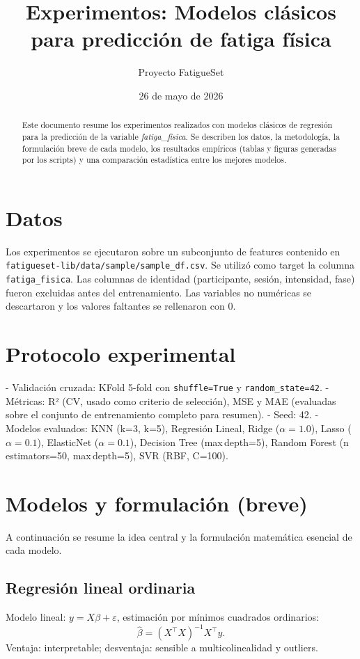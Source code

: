 \documentclass[11pt,a4paper]{article}
\title{Experimentos: Modelos clásicos para predicción de fatiga física}
\author{Proyecto FatigueSet}
\date{26 de mayo de 2026}
\begin{document}
\sloppy
\maketitle

\begin{abstract}
Este documento resume los experimentos realizados con modelos clásicos de regresión para la predicción de la variable \textit{fatiga\_fisica}. Se describen los datos, la metodología, la formulación breve de cada modelo, los resultados empíricos (tablas y figuras generadas por los scripts) y una comparación estadística entre los mejores modelos.
\end{abstract}

\section{Datos}
Los experimentos se ejecutaron sobre un subconjunto de features contenido en \verb|fatigueset-lib/data/sample/sample_df.csv|. Se utilizó como target la columna \texttt{fatiga\_fisica}. Las columnas de identidad (participante, sesión, intensidad, fase) fueron excluidas antes del entrenamiento. Las variables no numéricas se descartaron y los valores faltantes se rellenaron con 0.

\section{Protocolo experimental}
- Validación cruzada: KFold 5-fold con \texttt{shuffle=True} y \texttt{random\_state=42}.
- Métricas: R² (CV, usado como criterio de selección), MSE y MAE (evaluadas sobre el conjunto de entrenamiento completo para resumen).
- Seed: 42.
- Modelos evaluados: KNN (k=3, k=5), Regresión Lineal, Ridge (\(\alpha=1.0\)), Lasso (\(\alpha=0.1\)), ElasticNet (\(\alpha=0.1\)), Decision Tree (max\,depth=5), Random Forest (n\,estimators=50, max\,depth=5), SVR (RBF, C=100).

\section{Modelos y formulación (breve)}
A continuación se resume la idea central y la formulación matemática esencial de cada modelo.

\subsection{Regresión lineal ordinaria}
Modelo lineal: \(y = X\beta + \varepsilon\), estimación por mínimos cuadrados ordinarios:
\[ \hat{\beta} = (X^{\top}X)^{-1} X^{\top} y. \]
Ventaja: interpretable; desventaja: sensible a multicolinealidad y outliers.
\end{document}
